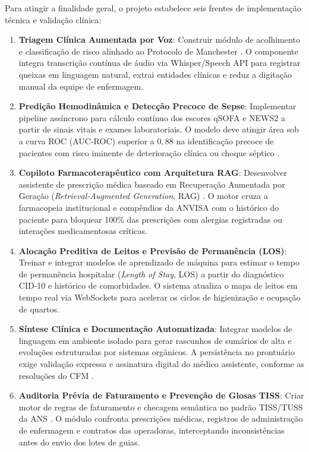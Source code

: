 Para atingir a finalidade geral, o projeto estabelece seis frentes de implementação técnica e validação clínica:

\begin{enumerate}[leftmargin=*]
    \item \textbf{Triagem Clínica Aumentada por Voz}: Construir módulo de acolhimento e classificação de risco alinhado ao Protocolo de Manchester \cite{manchester:2014}. O componente integra transcrição contínua de áudio via Whisper/Speech API para registrar queixas em linguagem natural, extrai entidades clínicas e reduz a digitação manual da equipe de enfermagem.
    \item \textbf{Predição Hemodinâmica e Detecção Precoce de Sepse}: Implementar pipeline assíncrono para cálculo contínuo dos escores qSOFA e NEWS2 a partir de sinais vitais e exames laboratoriais. O modelo deve atingir área sob a curva ROC (AUC-ROC) superior a $0{,}88$ na identificação precoce de pacientes com risco iminente de deterioração clínica ou choque séptico \cite{singer_sepsis:2016}.
    \item \textbf{Copiloto Farmacoterapêutico com Arquitetura RAG}: Desenvolver assistente de prescrição médica baseado em Recuperação Aumentada por Geração (\textit{Retrieval-Augmented Generation}, RAG) \cite{lewis_rag:2020}. O motor cruza a farmacopeia institucional e compêndios da ANVISA com o histórico do paciente para bloquear 100\% das prescrições com alergias registradas ou interações medicamentosas críticas.
    \item \textbf{Alocação Preditiva de Leitos e Previsão de Permanência (LOS)}: Treinar e integrar modelos de aprendizado de máquina para estimar o tempo de permanência hospitalar (\textit{Length of Stay}, LOS) a partir do diagnóstico CID-10 e histórico de comorbidades. O sistema atualiza o mapa de leitos em tempo real via WebSockets para acelerar os ciclos de higienização e ocupação de quartos.
    \item \textbf{Síntese Clínica e Documentação Automatizada}: Integrar modelos de linguagem em ambiente isolado para gerar rascunhos de sumários de alta e evoluções estruturadas por sistemas orgânicos. A persistência no prontuário exige validação expressa e assinatura digital do médico assistente, conforme as resoluções do CFM \cite{cfm_prontuario:2007,cfm_digital:2021}.
    \item \textbf{Auditoria Prévia de Faturamento e Prevenção de Glosas TISS}: Criar motor de regras de faturamento e checagem semântica no padrão TISS/TUSS da ANS \cite{ans_tiss:2023}. O módulo confronta prescrições médicas, registros de administração de enfermagem e contratos das operadoras, interceptando inconsistências antes do envio dos lotes de guias.
\end{enumerate}

